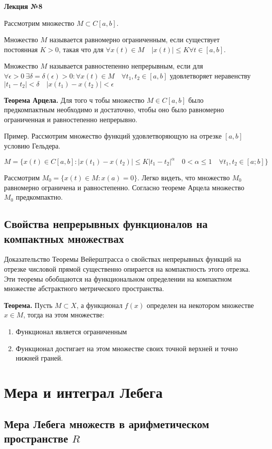 \documentclass[14pt,a4paper]{extarticle}
\theoremstyle{definition}
\theoremstyle{remark}
\newcommand{\be}{\begin{enumerate}}
\newcommand{\ee}{\end{enumerate}}
\renewcommand{\[}{\begin{dmath*}[compact]}
\renewcommand{\]}{\end{dmath*}}
\newcommand{\tth}[1][]{\textbf{Теорема#1.}}
\begin{document}
\textbf{Лекция №8}

Рассмотрим множество $M\subset C[a,b]$.

Множество $M$ называется равномерно ограниченным, если существует постоянная $K>0$, такая что для $\forall x(t)\in M \quad |x(t)|\leq K \forall t \in [a,b]$.

Множество $M$ называется равностепенно непрерывным, если для $\forall \epsilon > 0 \ \exists \delta = \delta(\epsilon)>0:\forall x(t)\in M\quad \forall t_1,t_2\in [a,b]$ удовлетворяет неравенству $|t_1-t_2|<\delta \quad |x(t_1)-x(t_2)|<\epsilon$

\tth[ Арцела] Для того ч тобы множество $M\in C[a,b]$ было предкомпактным необходимо и достаточно, чтобы оно было равномерно ограниченная и равностепенно непрерывно.

Пример. Рассмотрим множество функций удовлетворяющую на отрезке $[a,b]$ условию Гельдера.

\[
M=\{x(t)\in C[a,b]: |x(t_1)-x(t_2)|\leq K|t_1-t_2|^\alpha \quad 0 < \alpha \leq 1 \quad \forall t_1,t_2 \in [a;b]\}
\]

Рассмотрим $M_0=\{x(t)\in M:x(a)=0\}$. Легко видеть, что множество $M_0$ равномерно ограничена и равностепенно. Согласно теореме Арцела множество $M_0$ предкомпактно.

\subsection{Свойства непрерывных функционалов на компактных множествах}

Доказательство Теоремы Вейерштрасса о свойствах непрерывных функций на отрезке числовой прямой существенно опирается на компактность этого отрезка. Эти теоремы обобщаются на функциональном определении на компактном множестве абстрактного метрического пространства.

\tth[] Пусть $M\subset X$, а функционал $f(x)$ определен на некотором множестве $x \in M$, тогда на этом множестве:

\be
  \item Функционал является ограниченным
  \item Функционал достигает на этом множестве своих точной верхней и точно нижней граней.
\ee

\section{Мера и интеграл Лебега}

\subsection{Мера Лебега множеств в арифметическом пространстве \texorpdfstring{$R$}{Lg}}
\end{document}
